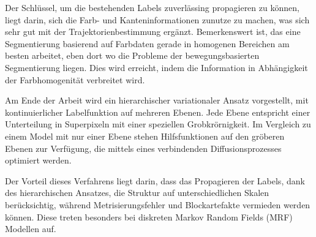 Der Schlüssel, um die bestehenden Labels zuverlässing propagieren zu können, liegt darin, sich die Farb- und Kanteninformationen
zunutze zu machen, was sich sehr gut mit der Trajektorienbestimmung ergänzt. Bemerkenswert ist, das eine Segmentierung basierend auf Farbdaten
gerade in homogenen Bereichen am besten arbeitet, eben dort wo die Probleme der bewegungsbasierten Segmentierung liegen.
Dies wird erreicht, indem die Information in Abhängigkeit der Farbhomogenität verbreitet wird.

Am Ende der Arbeit wird ein hierarchischer variationaler Ansatz vorgestellt, mit kontinuierlicher Labelfunktion auf mehreren Ebenen.
Jede Ebene entspricht einer Unterteilung in Superpixeln mit einer speziellen Grobkrörnigkeit.
Im Vergleich zu einem Model mit nur einer Ebene stehen Hilfsfunktionen auf den gröberen Ebenen zur Verfügung, die mittels eines
verbindenden Diffusionsprozesses optimiert werden.

Der Vorteil dieses Verfahrens liegt darin, dass das Propagieren der Labels, dank des hierarchischen Ansatzes, die Struktur auf unterschiedlichen
Skalen berücksichtig, während Metrisierungsfehler und Blockartefakte vermieden werden können.
Diese treten besonders bei diskreten Markov Random Fields (MRF) Modellen auf.


